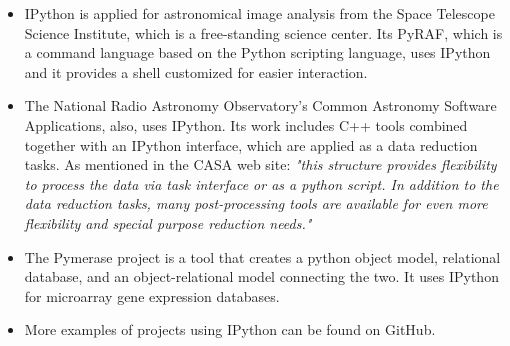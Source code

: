 \begin{itemize}
\item IPython is applied for astronomical image analysis from the Space Telescope Science Institute, which is a free-standing science center. Its PyRAF, which is a command language based on the Python scripting language, uses IPython and it provides a shell customized for easier interaction. \cite{pyRaf}

\item The National Radio Astronomy Observatory’s Common Astronomy Software Applications, also, uses IPython. Its work includes C++ tools combined together with an IPython interface, which are applied as a data reduction tasks.\cite{casa} As mentioned in the CASA web site: \textit{"this structure provides flexibility to process the data via task interface or as a python script. In addition to the data reduction tasks, many post-processing tools are available for even more flexibility and special purpose reduction needs."}\cite{casa}

\item The Pymerase project is a tool that creates a python object model, relational database, and an object-relational model connecting the two. It uses IPython for microarray gene expression databases.\cite{pymerase}

\item More examples of projects using IPython can be found on GitHub.\cite{gitHubAlliPython}
\end{itemize}







